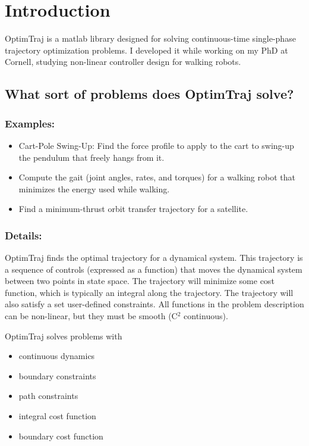 \section{Introduction}

OptimTraj is a matlab library designed for solving continuous-time single-phase trajectory optimization problems. I developed it while working on my PhD at Cornell, studying non-linear controller design for walking robots.

\subsection{What sort of problems does OptimTraj solve?}

\subsubsection*{Examples:}
\begin{itemize} 
\item Cart-Pole Swing-Up: Find the force profile to apply to the cart to swing-up the pendulum that freely hangs from it.
\item Compute the gait (joint angles, rates, and torques) for a walking robot that minimizes the energy used while walking.
\item Find a minimum-thrust orbit transfer trajectory for a satellite.
\end{itemize}

\subsubsection*{Details:}

OptimTraj finds the optimal trajectory for a dynamical system. This trajectory is a sequence of controls (expressed as a function) that moves the dynamical system between two points in state space. The trajectory will minimize some cost function, which is typically an integral along the trajectory. The trajectory will also satisfy a set user-defined constraints. All functions in the problem description can be non-linear, but they must be smooth (C$^2$ continuous).

OptimTraj solves problems with
\begin{itemize} \setlength\itemsep{-0.1em}
\item continuous dynamics
\item boundary constraints
\item path constraints
\item integral cost function
\item boundary cost function
\end{itemize}


